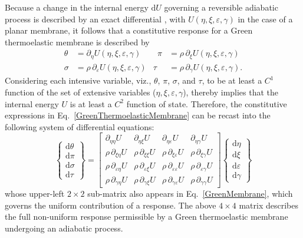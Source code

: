 Because a change in the internal energy $\mathrm{d} U$ governing a reversible adiabatic process is described by an exact differential \cite{Caratheodory09}, with $U( \eta, \xi, \varepsilon, \gamma )$ in the case of a planar membrane, it follows that a constitutive response for a Green thermo\-elastic membrane is described by
\begin{equation}
    \begin{aligned}
    \theta & = \partial_{\eta} U(\eta, \xi, \varepsilon, \gamma) &
    \phantom{\rho}
    \pi & = \rho \, \partial_{\xi} U(\eta, \xi, \varepsilon, \gamma)  \\
    \sigma & = \rho \, \partial_{\varepsilon} U(\eta, \xi, \varepsilon, \gamma) &
    \tau & = \rho \, \partial_{\gamma} U(\eta, \xi, \varepsilon, \gamma) .
    \end{aligned}
    \label{GreenThermoelasticMembrane}
\end{equation}
Considering each intensive variable, viz., $\theta$, $\pi$, $\sigma$, and $\tau$, to be at least a $C^1$ function of the set of extensive variables ($\eta , \xi , \varepsilon , \gamma$), thereby implies that the internal energy $U$ is at least a $C^2$ function of state.  Therefore, the constitutive expressions in Eq.~\ref{GreenThermoelasticMembrane} can be recast into the following system of differential equations:
\begin{equation}
\label{energies2D}
\left\{ \begin{matrix}
\mathrm{d} \theta \\ \mathrm{d} \pi \\
\mathrm{d} \sigma \\ \mathrm{d} \tau
\end{matrix} \right\} = \begin{bmatrix}
\partial_{\eta\eta} U & 
\partial_{\eta\xi} U & 
\partial_{\eta\varepsilon} U & 
\partial_{\eta\gamma} U \\ 
\rho \, \partial_{\xi\eta} U & 
\rho \, \partial_{\xi\xi} U & 
\rho \, \partial_{\xi\varepsilon} U &
\rho \, \partial_{\xi\gamma} U \\
\rho \, \partial_{\varepsilon\eta} U & 
\rho \, \partial_{\varepsilon\xi} U & 
\rho \, \partial_{\varepsilon\varepsilon} U & 
\rho \, \partial_{\varepsilon\gamma} U \\
\rho \, \partial_{\gamma\eta} U & 
\rho \, \partial_{\gamma\xi} U & 
\rho \, \partial_{\gamma\varepsilon} U & 
\rho \, \partial_{\gamma\gamma} U 
\end{bmatrix} 
\left\{ \begin{matrix}
\mathrm{d}\eta \\ \mathrm{d} \xi \\
\mathrm{d} \varepsilon \\ \mathrm{d} \gamma
\end{matrix} \right\}  
\end{equation}
whose upper-left $2\times 2$ sub-matrix also appears in Eq.~\ref{GreenMembrane}, which governs the uniform contribution of a response.  The above $4 \times 4$ matrix describes the full non-uniform response permissible by a Green thermo\-elastic membrane undergoing an adiabatic process.


